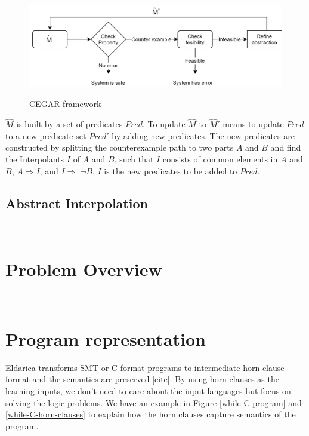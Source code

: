 \documentclass{article}
\begin{document}
\begin{figure}[h]
\centering
  \includegraphics[width=12cm]{graph/CEGAR}\\
  \caption{CEGAR framework}\label{CEGAR}
\end{figure}


$\widehat{M}$ is built by a set of predicates $Pred$. To update $\widehat{M}$ to $\widehat{M}'$ means to update $Pred$ to a new predicate set $Pred'$ by adding new predicates. The new predicates are constructed by splitting the counterexample path to two parts $A$ and $B$ and find the Interpolants $I$ of $A$ and $B$, such that $I$ consists of common elements in $A$ and $B$, $A\Rightarrow I$, and $I\Rightarrow$ $\neg B$. $I$ is the new predicates to be added to $Pred$.

\subsection{Abstract Interpolation}
---
\section{Problem Overview}
---

\section{Program representation}
Eldarica transforms SMT or C format programs to intermediate horn clause format and the semantics are preserved [cite].  By using horn clauses as the learning inputs, we don't need to care about the input languages but focus on solving the logic problems. We have an example in Figure \ref{while-C-program} and \ref{while-C-horn-clauses} to explain how the horn clauses capture semantics of the program.
\end{document}
